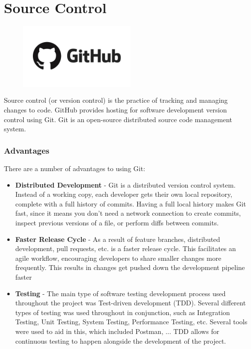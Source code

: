 \section{Source Control}
\begin{center}
    \includegraphics[width=8cm,height=3.3cm,keepaspectratio]{images/github}
\end{center}

Source control (or version control) is the practice of tracking and managing
changes to code. GitHub provides hosting for software development version
control using Git. Git is an open-source distributed source code management
system.

\subsubsection{Advantages}
There are a number of advantages to using Git:

\begin{itemize}
    \item \textbf{Distributed Development} - Git is a distributed version
    control system. Instead of a working copy, each developer gets their own 
    local repository, complete with a full history of commits. Having a full 
    local history makes Git fast, since it means you don’t need a network 
    connection to create commits, inspect previous versions of a file, or 
    perform diffs between commits.
    \item \textbf{Faster Release Cycle} - As a result of feature branches,
    distributed development, pull requests, etc. is a faster release cycle. This
    facilitates an agile workflow, encouraging developers to share smaller 
    changes more frequently. This results in changes get pushed down the 
    development pipeline faster
    \item \textbf{Testing} - The main type of software testing development 
    process used throughout the project was Test-driven development (TDD). 
    Several different types of testing was used throughout in conjunction, such 
    as Integration Testing, Unit Testing, System Testing, Performance Testing, 
    etc. Several tools were used to aid in this, which included Postman, ... TDD
    allows for continuous testing to happen alongside the development of the 
    project.
\end{itemize}
\newpage
